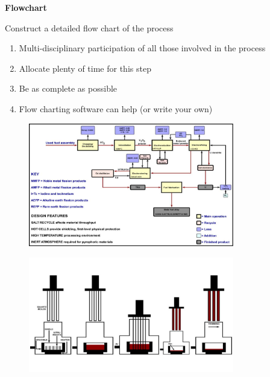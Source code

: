 \documentclass[aspectratio=1610,pdftex,dvipsnames,compress,xcolor={dvipsnames}]{beamer}
\begin{document}
\begin{frame}[plain]{}
    \centering\LARGE\textbf{Flowchart}
\end{frame}


\addtocounter{framenumber}{-2}
\begin{frame}{Construct a detailed flow chart of the process}
    \begin{enumerate}[series=outerlist,topsep=0pt,itemsep=21pt,leftmargin=*,label=(\arabic*)]
        \item[]Multi-disciplinary participation of all those involved in the process
        \item[]Allocate plenty of time for this step
        \item[]Be as complete as possible
        \item[]Flow charting software can help (or write your own)
    \end{enumerate}
\end{frame}


\begin{frame}{}
    \begin{figure}
        \centering
        \includegraphics[width=0.80\textwidth]{pyroprocessing.flowsheet.jpg}
    \end{figure}
\end{frame}


\begin{frame}{}
    \begin{figure}
        \centering
        \includegraphics[width=0.80\textwidth]{fuel.fabrication.jpg}
    \end{figure}
\end{frame}
\end{document}
